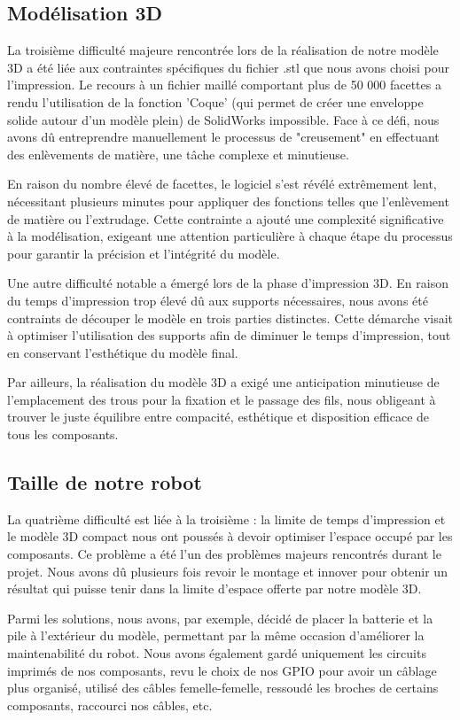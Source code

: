 \subsection{Modélisation 3D}
La troisième difficulté majeure rencontrée lors de la réalisation de notre modèle 3D a été liée aux contraintes spécifiques du fichier .stl que nous avons choisi pour l'impression. Le recours à un fichier maillé comportant plus de 50 000 facettes a rendu l'utilisation de la fonction 'Coque' (qui permet de créer une enveloppe solide autour d'un modèle plein) de SolidWorks impossible. Face à ce défi, nous avons dû entreprendre manuellement le processus de "creusement" en effectuant des enlèvements de matière, une tâche complexe et minutieuse.

En raison du nombre élevé de facettes, le logiciel s'est révélé extrêmement lent, nécessitant plusieurs minutes pour appliquer des fonctions telles que l'enlèvement de matière ou l'extrudage. Cette contrainte a ajouté une complexité significative à la modélisation, exigeant une attention particulière à chaque étape du processus pour garantir la précision et l'intégrité du modèle.

Une autre difficulté notable a émergé lors de la phase d'impression 3D. En raison du temps d'impression trop élevé dû aux supports nécessaires, nous avons été contraints de découper le modèle en trois parties distinctes. Cette démarche visait à optimiser l'utilisation des supports afin de diminuer le temps d'impression, tout en conservant l'esthétique du modèle final.

Par ailleurs, la réalisation du modèle 3D a exigé une anticipation minutieuse de l'emplacement des trous pour la fixation et le passage des fils, nous obligeant à trouver le juste équilibre entre compacité, esthétique et disposition efficace de tous les composants.

\subsection{Taille de notre robot}
La quatrième difficulté est liée à la troisième : la limite de temps d'impression et le modèle 3D compact nous ont poussés à devoir optimiser l'espace occupé par les composants. Ce problème a été l'un des problèmes majeurs rencontrés durant le projet. Nous avons dû plusieurs fois revoir le montage et innover pour obtenir un résultat qui puisse tenir dans la limite d'espace offerte par notre modèle 3D.

Parmi les solutions, nous avons, par exemple, décidé de placer la batterie et la pile à l'extérieur du modèle, permettant par la même occasion d'améliorer la maintenabilité du robot. Nous avons également gardé uniquement les circuits imprimés de nos composants, revu le choix de nos GPIO pour avoir un câblage plus organisé, utilisé des câbles femelle-femelle, ressoudé les broches de certains composants, raccourci nos câbles, etc.

